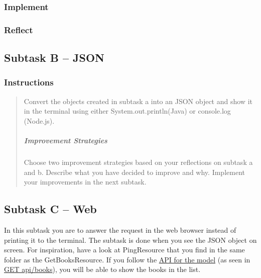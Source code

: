 \subsubsection{Implement}\label{implement}

\subsubsection{Reflect}\label{reflect}


\subsection{Subtask B -- JSON}\label{subtask-b-json}

\subsubsection{Instructions}\label{instructions-2}

\begin{quote}
Convert the objects created in subtask a into an JSON object and show it
in the terminal using either System.out.println(Java) or console.log
(Node.js).

\mbox{}%
\subparagraph{Improvement Strategies}\label{improvement-strategies}

Choose two improvement strategies based on your reflections on subtask a
and b. Describe what you have decided to improve and why. Implement your
improvements in the next subtask.
\end{quote}


\subsection{Subtask C -- Web}\label{subtask-c-web}

In this subtask you are to answer the request in the web browser instead
of printing it to the terminal. The subtask is done when you see the
JSON object on screen. For inspiration, have a look at PingResource that
you find in the same folder as the GetBooksResource. If you follow the
\href{https://htmlpreview.github.io/?https://github.com/tobias-dv-lnu/1dv600-lab/blob/master/api-specification/api-specification.html}{API
for the model} (as seen in
\href{https://htmlpreview.github.io/?https://github.com/tobias-dv-lnu/1dv600-lab/blob/master/api-specification/api-specification.html\#books-get}{GET
api/books})​, you will be able to show the books in the list.

